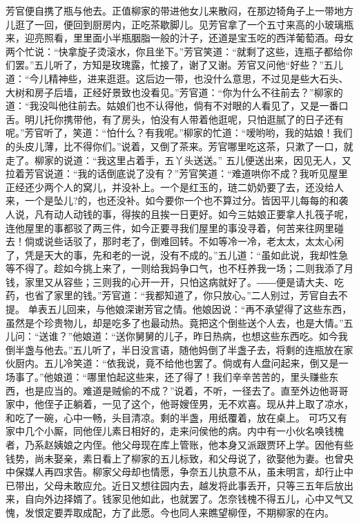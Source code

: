 \documentclass[12pt,oneside]{book}
\begin{document}
芳官便自携了瓶与他去。正值柳家的带进他女儿来散闷，在那边犄角子上一带地方儿逛了一回，便回到厨房内，正吃茶歇脚儿。见芳官拿了一个五寸来高的小玻璃瓶来，迎亮照看，里里面小半瓶胭脂一般的汁子，还道是宝玉吃的西洋葡萄酒。母女两个忙说：“快拿旋子烫滚水，你且坐下。”芳官笑道：“就剩了这些，连瓶子都给你们罢。”五儿听了，方知是玫瑰露，忙接了，谢了又谢。芳官又问他“好些？”五儿道：“今儿精神些，进来逛逛。这后边一带，也没什么意思，不过见是些大石头、大树和房子后墙，正经好景致也没看见。”芳官道：“你为什么不往前去？”柳家的道：“我没叫他往前去。姑娘们也不认得他，倘有不对眼的人看见了，又是一番口舌。明儿托你携带他，有了房头，怕没有人带着他逛呢，只怕逛腻了的日子还有呢。”芳官听了，笑道：“怕什么？有我呢。”柳家的忙道：“嗳哟哟，我的姑娘！我们的头皮儿薄，比不得你们。”说着，又倒了茶来。芳官哪里吃这茶，只漱了一口，就走了。柳家的说道：“我这里占着手，五丫头送送。”
五儿便送出来，因见无人，又拉着芳官说道：“我的话倒底说了没有？”芳官笑道：“难道哄你不成？我听见屋里正经还少两个人的窝儿，并没补上。一个是红玉的，琏二奶奶要了去，还没给人来，一个是坠儿?的，也还没补。如今要你一个也不算过分。皆因平儿每每的和袭人说，凡有动人动钱的事，得挨的且挨一日更好。如今三姑娘正要拿人扎筏子呢，连他屋里的事都驳了两三件，如今正要寻我们屋里的事没寻着，何苦来往网里碰去！倘或说些话驳了，那时老了，倒难回转。不如等冷一冷，老太太，太太心闲了，凭是天大的事，先和老的一说，没有不成的。”五儿道：“虽如此说，我却性急等不得了。趁如今挑上来了，一则给我妈争口气，也不枉养我一场；二则我添了月钱，家里又从容些；三则我的心开一开，只怕这病就好了。――便是请大夫、吃药，也省了家里的钱。”芳官道：“我都知道了，你只放心。”二人别过，芳官自去不提。
单表五儿回来，与他娘深谢芳官之情。他娘因说：“再不承望得了这些东西，虽然是个珍贵物儿，却是吃多了也最动热。竟把这个倒些送个人去，也是大情。”五儿问：“送谁？”他娘道：“送你舅舅的儿子，昨日热病，也想这些东西吃。如今我倒半盏与他去。”五儿听了，半日没言语，随他妈倒了半盏子去，将剩的连瓶放在家伙厨内。五儿冷笑道：“依我说，竟不给他也罢了。倘或有人盘问起来，倒又是一场事了。”他娘道：“哪里怕起这些来，还了得了！我们辛辛苦苦的，里头赚些东西，也是应当的。难道是贼偷的不成？”说着，不听，一径去了。直至外边他哥哥家中，他侄子正躺着，一见了这个，他哥嫂侄男，无不欢喜。现从井上取了凉水，和吃了一碗，心中一畅，头目清凉。剩的半盏，用纸覆着，放在桌上。
可巧又有家中几个小厮，同他侄儿素日相好的，走来问侯他的病。内中有一小伙名唤钱槐者，乃系赵姨娘之内侄。他父母现在库上管账，他本身又派跟贾环上学。因他有些钱势，尚未娶亲，素日看上了柳家的五儿标致，和父母说了，欲娶他为妻。也曾央中保媒人再四求告。柳家父母却也情愿，争奈五儿执意不从，虽未明言，却行止中已带出，父母未敢应允。近日又想往园内去，越发将此事丢开，只等三五年后放出来，自向外边择婿了。钱家见他如此，也就罢了。怎奈钱槐不得五儿，心中又气又愧，发恨定要弄取成配，方了此愿。今也同人来瞧望柳侄，不期柳家的在内。
\end{document}
